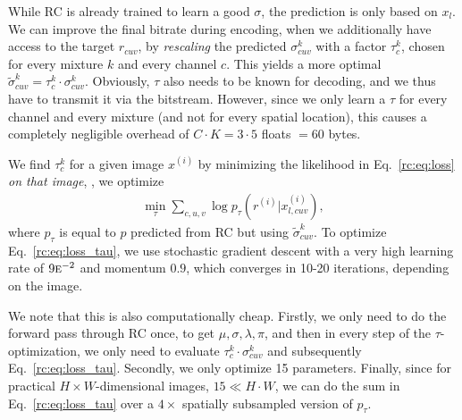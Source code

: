 While RC is already trained to learn a good $\sigma$, the prediction is only based on $x_l$. We can improve the final bitrate during encoding, when we additionally have access to the target $r_{cuv}$, by \emph{rescaling} the predicted $\sigma^k_{cuv}$ with a factor $\tau^k_c$, chosen for every mixture $k$ and every channel $c$. This yields a more optimal
$\tilde \sigma^k_{cuv} = \tau_{c}^k \cdot \sigma^k_{cuv}. $
Obviously, $\tau$ also needs to be known for decoding, and we thus have to transmit it via the bitstream. However, since we only learn a $\tau$ for every channel and every mixture (and not for every spatial location), this causes a completely negligible overhead of $C \cdot K = 3 \cdot 5$ floats $=60$ bytes.

We find $\tau_c^k$ for a given image $x^{(i)}$ by minimizing the likelihood in Eq.~\ref{rc:eq:loss} \emph{on that image}, \ie, we optimize
%
\begin{align}
%
\min_\tau \sum_{c,u,v} \log p_\tau(r^{(i)}|x_{l,cuv}^{(i)}), \label{rc:eq:loss_tau}
\end{align}
where $p_\tau$ is equal to $p$ predicted from RC but using $\tilde \sigma_{cuv}^k$. To optimize Eq.~\ref{rc:eq:loss_tau}, we 
use stochastic gradient descent with a very high learning rate of $9\textsc{e}^{-2}$ and momentum $0.9$, which converges in 10-20 iterations, depending on the image.

We note that this is also computationally cheap.
Firstly, we only need to do the forward pass through RC once, to get $\mu, \sigma, \lambda, \pi$, and then in every step of the $\tau$-optimization, we only need to evaluate $\tau_c^k \cdot \sigma_{cuv}^k$ and subsequently Eq.~\ref{rc:eq:loss_tau}. Secondly, we only optimize 15 parameters. Finally, since for practical $H{\times}W$-dimensional images, $15 \ll H\cdot W$, we can do the sum in Eq.~\ref{rc:eq:loss_tau} over a $4{\times}$ spatially subsampled version of $p_\tau$.


